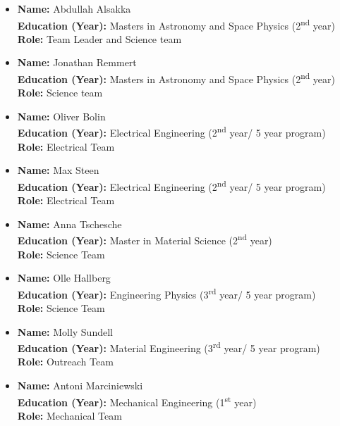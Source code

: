 \begin{itemize}
    \item \textbf{Name:} Abdullah Alsakka \\
    \textbf{Education (Year):} Masters in Astronomy and Space Physics (2\textsuperscript{nd} year) \\
    \textbf{Role:} Team Leader and Science team

    \item \textbf{Name:} Jonathan Remmert \\
    \textbf{Education (Year):} Masters in Astronomy and Space Physics (2\textsuperscript{nd} year) \\
    \textbf{Role:} Science team
    
    \item \textbf{Name:} Oliver Bolin \\
    \textbf{Education (Year):} Electrical Engineering (2\textsuperscript{nd} year/ 5 year program) \\
    \textbf{Role:} Electrical Team
    
    \item \textbf{Name:} Max Steen \\
    \textbf{Education (Year):} Electrical Engineering (2\textsuperscript{nd} year/ 5 year program) \\
    \textbf{Role:} Electrical Team

    \item \textbf{Name:} Anna Tschesche \\
    \textbf{Education (Year):} Master in Material Science (2\textsuperscript{nd} year) \\
    \textbf{Role:} Science Team

    \item \textbf{Name:} Olle Hallberg \\
    \textbf{Education (Year):} Engineering Physics (3\textsuperscript{rd} year/ 5 year program) \\
    \textbf{Role:} Science Team

    \item \textbf{Name:} Molly Sundell \\
    \textbf{Education (Year):} Material Engineering (3\textsuperscript{rd} year/ 5 year program) \\
    \textbf{Role:} Outreach Team

    \item \textbf{Name:} Antoni Marciniewski \\
    \textbf{Education (Year):} Mechanical Engineering (1\textsuperscript{st} year) \\
    \textbf{Role:} Mechanical Team


\end{itemize}
